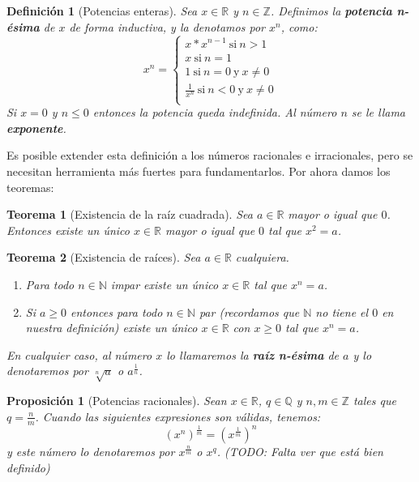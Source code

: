 \documentclass{article}
\newtheorem{theorem}{Teorema}
\newtheorem{prop}{Proposición}
\newtheorem{define}{Definición}
\begin{document}
\begin{define}[Potencias enteras]
Sea $x\in \mathbb{R}$ y $n\in \mathbb{Z}$. Definimos la \textbf{potencia n-ésima} de $x$ de forma inductiva, y la denotamos por $x^n$, como:
\begin{equation}
x^n = \left\lbrace
\begin{array}{l}
x * x^{n-1}\ \text{si}\ n > 1 \\
x\ \text{si}\ n = 1 \\
1\ \text{si}\ n = 0\ \text{y}\ x \neq 0 \\
\frac{1}{x^n}\ \text{si}\ n < 0\ \text{y}\ x \neq 0 \\
\end{array}
\right.
\end{equation}
Si $x = 0$ y $n \leq 0$ entonces la potencia queda indefinida. Al número $n$ se le llama \textbf{exponente}.
\end{define}

Es posible extender esta definición a los números racionales e irracionales, pero se necesitan herramienta más fuertes para fundamentarlos. Por ahora damos los teoremas:

\begin{theorem}[Existencia de la raíz cuadrada]
Sea $a \in \mathbb{R}$ mayor o igual que $0$. Entonces existe un único $x \in \mathbb{R}$ mayor o igual que $0$ tal que $x^2 = a$.
\end{theorem}

\begin{theorem}[Existencia de raíces]
Sea $a \in \mathbb{R}$ cualquiera.
\begin{enumerate}
\item
Para todo $n \in \mathbb{N}$ impar existe un único $x\in \mathbb{R}$ tal que $x^n = a$.
\item
Si $a\geq 0$ entonces para todo $n \in \mathbb{N}$ par (recordamos que $\mathbb{N}$ no tiene el $0$ en nuestra definición) existe un único $x\in \mathbb{R}$ con $x\geq 0$ tal que $x^n = a$.
\end{enumerate}
En cualquier caso, al número $x$ lo llamaremos la \textbf{raíz n-ésima} de $a$ y lo denotaremos por $\sqrt[n]{a}$ o $a^{\frac{1}{n}}$.
\end{theorem}

\begin{prop}[Potencias racionales]
Sean $x \in \mathbb{R}$, $q \in \mathbb{Q}$ y $n,m \in \mathbb{Z}$ tales que $q = \frac{n}{m}$. Cuando las siguientes expresiones son válidas, tenemos:
\begin{equation}
(x^n)^{\frac{1}{m}} = (x^{\frac{1}{m}})^n
\end{equation}
y este número lo denotaremos por $x^{\frac{n}{m}}$ o $x^q$. (TODO: Falta ver que está bien definido)
\end{prop}
\end{document}
